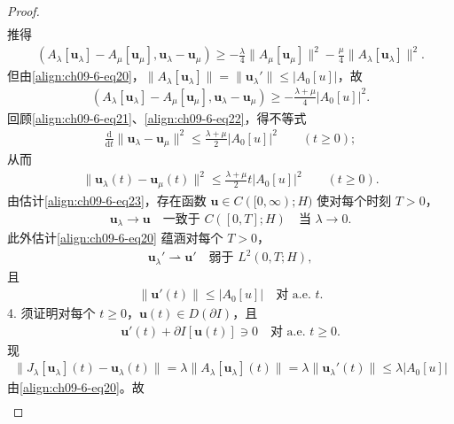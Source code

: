 \documentclass[../../main.tex]{subfiles}
\begin{document}
\begin{theorem}[梯度流的解]
\begin{proof}
\begin{align*}
\end{align*}
推得
\begin{align*}
(A_\lambda[\mathbf{u}_\lambda]-A_\mu[\mathbf{u}_\mu],\mathbf{u}_\lambda-\mathbf{u}_\mu)\geqslant-\frac\lambda4\|A_\mu[\mathbf{u}_\mu]\|^2-\frac\mu4\|A_\lambda[\mathbf{u}_\lambda]\|^2.
\end{align*}
但由\eqref{align:ch09-6-eq20}，$\|A_\lambda[\mathbf{u}_\lambda]\|=\|\mathbf{u}_\lambda'\|\leqslant|A_0[u]|$，故
\begin{align*}
(A_\lambda[\mathbf{u}_\lambda]-A_\mu[\mathbf{u}_\mu],\mathbf{u}_\lambda-\mathbf{u}_\mu)\geqslant-\frac{\lambda+\mu}{4}|A_0[u]|^2.
\end{align*}
回顾\eqref{align:ch09-6-eq21}、\eqref{align:ch09-6-eq22}，得不等式
\begin{align*}
\frac{\mathrm{d}}{\mathrm{d}t}\|\mathbf{u}_\lambda-\mathbf{u}_\mu\|^2\leqslant\frac{\lambda+\mu}{2}|A_0[u]|^2\qquad (t\geqslant 0);
\end{align*}
从而
\begin{align}
\|\mathbf{u}_\lambda(t)-\mathbf{u}_\mu(t)\|^2\leqslant\frac{\lambda+\mu}{2}t|A_0[u]|^2\qquad (t\geqslant 0).\label{align:ch09-6-eq23}
\end{align}
由估计\eqref{align:ch09-6-eq23}，存在函数 $\mathbf{u}\in C([0,\infty);H)$ 使对每个时刻 $T>0$，
\begin{align*}
\mathbf{u}_\lambda\to\mathbf{u}\quad\text{一致于 }C([0,T];H)\quad\text{当 }\lambda\to 0.
\end{align*}
此外估计\eqref{align:ch09-6-eq20} 蕴涵对每个 $T>0$，
\begin{align}
\mathbf{u}_\lambda'\rightharpoonup\mathbf{u}'\quad\text{弱于 }L^2(0,T;H),\label{align:ch09-6-eq24}
\end{align}
且
\begin{align}
\|\mathbf{u}'(t)\|\leqslant|A_0[u]|\quad\text{对 a.e. }t.\label{align:ch09-6-eq25}
\end{align}
4. 须证明对每个 $t\geqslant 0$，$\mathbf{u}(t)\in D(\partial I)$，且
\begin{align*}
\mathbf{u}'(t)+\partial I[\mathbf{u}(t)]\ni 0\quad\text{对 a.e. }t\geqslant 0.
\end{align*}
现
\begin{align*}
\|J_\lambda[\mathbf{u}_\lambda](t)-\mathbf{u}_\lambda(t)\|=\lambda\|A_\lambda[\mathbf{u}_\lambda](t)\|=\lambda\|\mathbf{u}_\lambda'(t)\|\leqslant\lambda|A_0[u]|
\end{align*}
由\eqref{align:ch09-6-eq20}。故
\begin{align}

\end{align}
\end{proof}
\end{theorem}
\end{document}
